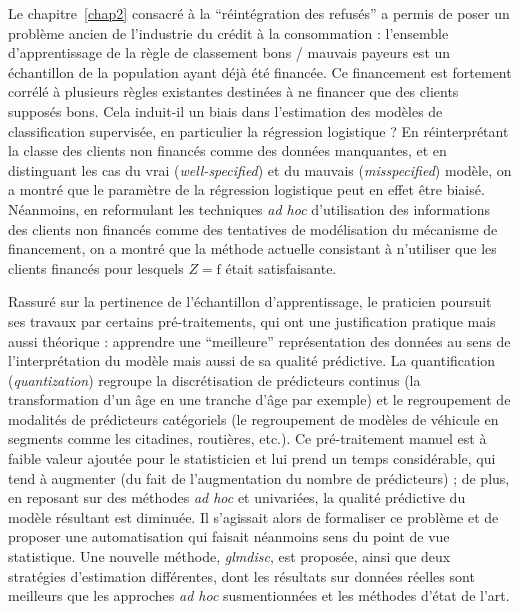 \medskip

Le chapitre~\ref{chap2} consacré à la ``réintégration des refusés'' a permis de poser un problème ancien de l'industrie du crédit à la consommation : l'ensemble d'apprentissage de la règle de classement bons / mauvais payeurs est un échantillon de la population ayant déjà été financée. Ce financement est fortement corrélé à plusieurs règles existantes destinées à ne financer que des clients supposés bons. Cela induit-il un biais dans l'estimation des modèles de classification supervisée, en particulier la régression logistique ? En réinterprétant la classe des clients non financés comme des données manquantes, et en distinguant les cas du vrai (\textit{well-specified}) et du mauvais (\textit{misspecified}) modèle, on a montré que le paramètre de la régression logistique peut en effet être biaisé. Néanmoins, en reformulant les techniques \textit{ad hoc} d'utilisation des informations des clients non financés comme des tentatives de modélisation du mécanisme de financement, on a montré que la méthode actuelle consistant à n'utiliser que les clients financés pour lesquels $Z = \text{f}$ était satisfaisante.

\medskip

Rassuré sur la pertinence de l'échantillon d'apprentissage, le praticien poursuit ses travaux par certains pré-traitements, qui ont une justification pratique mais aussi théorique : apprendre une ``meilleure'' représentation des données au sens de l'interprétation du modèle mais aussi de sa qualité prédictive. La quantification (\textit{quantization}) regroupe la discrétisation de prédicteurs continus (la transformation d'un âge en une tranche d'âge par exemple) et le regroupement de modalités de prédicteurs catégoriels (le regroupement de modèles de véhicule en segments comme les citadines, routières, etc.). Ce pré-traitement manuel est à faible valeur ajoutée pour le statisticien et lui prend un temps considérable, qui tend à augmenter (du fait de l'augmentation du nombre de prédicteurs) ; de plus, en reposant sur des méthodes \textit{ad hoc} et univariées, la qualité prédictive du modèle résultant est diminuée. Il s'agissait alors de formaliser ce problème et de proposer une automatisation qui faisait néanmoins sens du point de vue statistique. Une nouvelle méthode, \textit{glmdisc}, est proposée, ainsi que deux stratégies d'estimation différentes, dont les résultats sur données réelles sont meilleurs que les approches \textit{ad hoc} susmentionnées et les méthodes d'état de l'art.

